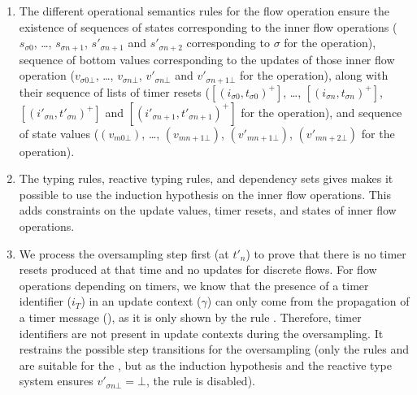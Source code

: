 \begin{skippableproof}
    \begin{enumerate}
        \item The different operational semantics rules for the flow operation ensure the existence
              of sequences of states corresponding to the inner flow operations ($s_{\sigma 0}$,
              \dots, $s_{\sigma n+1}$, $s'_{\sigma n+1}$ and $s'_{\sigma n+2}$ corresponding to
              $\sigma$ for the  operation), sequence of bottom values
              corresponding to the updates of those inner flow operation ($v_{\sigma 0\bot}$, \dots,
              $v_{\sigma n\bot}$, $v'_{\sigma n\bot}$ and $v'_{\sigma n+1\bot}$ for the
               operation), along with their sequence of lists of timer resets
              ($[(i_{\sigma0},t_{\sigma0})^+]$, \dots, $[(i_{\sigma n}, t_{\sigma n})^+]$,
              $[(i'_{\sigma n}, t'_{\sigma n})^+]$ and $[(i'_{\sigma n+1}, t'_{\sigma n+1})^+]$ for
              the  operation), and sequence of state values ($(v_{m0\bot})$,
              \dots, $(v_{mn+1\bot})$, $(v'_{mn+1\bot})$, $(v'_{mn+2\bot})$ for the
               operation).
        \item The typing rules, reactive typing rules, and dependency sets gives makes it possible
              to use the induction hypothesis on the inner flow operations. This adds constraints on
              the update values, timer resets, and states of inner flow operations.
        \item We process the oversampling step first (at $t'_n$) to prove that there is no timer
              resets produced at that time and no updates for discrete flows. For flow operations
              depending on timers, we know that the presence of a timer identifier ($i_T$) in an
              update context ($\gamma$) can only come from the propagation of a timer message
              (), as it is only shown by the rule
              . Therefore, timer identifiers
              are not present in update contexts during the oversampling. It restrains the possible
              step transitions for the oversampling (only the rules
               and
               are suitable for the
              , but as the induction hypothesis and the reactive type system
              ensures $v'_{\sigma n\bot} = \bot$, the rule
               is disabled).

\end{enumerate}
\end{skippableproof}

